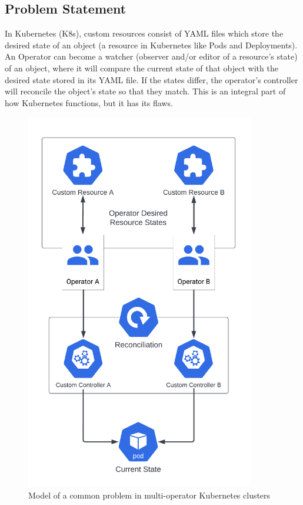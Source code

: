 \documentclass{article}
\begin{document}
\subsection{Problem Statement}
In Kubernetes (K8s), custom resources consist of YAML files which store the desired state of 
an object (a resource in Kubernetes like Pods and Deployments). An Operator can become a watcher 
(observer and/or editor of a resource's state) of an object, where it will compare the current state 
of that object with the desired state stored in its YAML file. If the states differ, the 
operator’s controller will reconcile the object’s state so that they match. This is an integral 
part of how Kubernetes functions, but it has its flaws. 

\begin{figure}[!hb]
    \centering
    \includegraphics[width=100mm]{problem-model.png}
    \caption{Model of a common problem in multi-operator Kubernetes clusters}
    \label{problem-model}
\end{figure}
\end{document}
